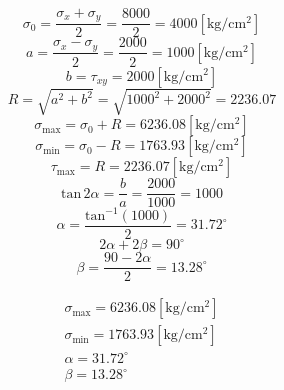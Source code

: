 \documentclass[letter,10pt,twoside]{article}
\begin{document}
\begin{equation*}
    \sigma_0 = \frac{\sigma_x + \sigma_y}{2}
             = \frac{8000}{2}
             = 4000[\text{kg}/\text{cm}^2]
\end{equation*}
\begin{equation*}
    a = \frac{\sigma_x - \sigma_y}{2}
      = \frac{2000}{2}
      = 1000[\text{kg}/\text{cm}^2]
\end{equation*}
\begin{equation*}
    b = \tau_{xy}
      = 2000[\text{kg}/\text{cm}^2]
\end{equation*}
\begin{equation*}
    R = \sqrt{a^2 + b^2}
      = \sqrt{1000^2 + 2000^2}
      = 2236.07
\end{equation*}
\begin{equation*}
    \sigma_{\text{max}} = \sigma_0 + R
                        = 6236.08[\text{kg}/\text{cm}^2]
\end{equation*}
\begin{equation*}
    \sigma_{\text{min}} = \sigma_0 - R
                        = 1763.93[\text{kg}/\text{cm}^2]
\end{equation*}
\begin{equation*}
    \tau_{\text{max}} = R
                      = 2236.07[\text{kg}/\text{cm}^2]
\end{equation*}
\begin{equation*}
    \text{tan}\,2\alpha = \frac{b}{a}
                        = \frac{2000}{1000}
                        = 1000
\end{equation*}
\begin{equation*}
    \alpha = \frac{\text{tan}^{-1}(1000)}{2}
           = 31.72^\circ
\end{equation*}
\begin{equation*}
    2\alpha + 2\beta = 90^\circ
\end{equation*}
\begin{equation*}
    \beta = \frac{90 - 2\alpha}{2}
          = 13.28^\circ
\end{equation*}

\begin{equation*}
\boxed{
    \begin{array}{l}
        \sigma_{\text{max}} = 6236.08[\text{kg}/\text{cm}^2] \\
        \sigma_{\text{min}} = 1763.93[\text{kg}/\text{cm}^2] \\
        \alpha = 31.72^\circ \\
        \beta = 13.28^\circ
    \end{array}
}
\end{equation*}
\end{document}
